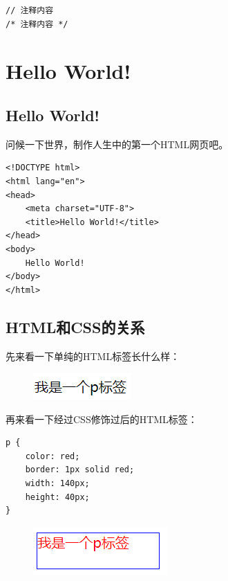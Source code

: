\begin{lstlisting}[style=htmlcssjs, title=JavaScript注释]
// 注释内容
/* 注释内容 */
\end{lstlisting}

\newpage

\section{Hello World!}

\subsection{Hello World!}

问候一下世界，制作人生中的第一个HTML网页吧。

\begin{lstlisting}[style=htmlcssjs, title=Hello World!]
<!DOCTYPE html>
<html lang="en">
<head>
    <meta charset="UTF-8">
    <title>Hello World!</title>
</head>
<body>
    Hello World!
</body>
</html>
\end{lstlisting}

\subsection{HTML和CSS的关系}

先来看一下单纯的HTML标签长什么样：

\begin{figure}[H]
    \centering
    \includegraphics[]{img/C1/1-3/1.png}
\end{figure}

再来看一下经过CSS修饰过后的HTML标签：

\begin{lstlisting}[style=htmlcssjs, title=Hello World!]
p {
    color: red;
    border: 1px solid red;
    width: 140px;
    height: 40px;
}
\end{lstlisting}

\begin{figure}[H]
    \centering
    \includegraphics[]{img/C1/1-3/2.png}
\end{figure}

